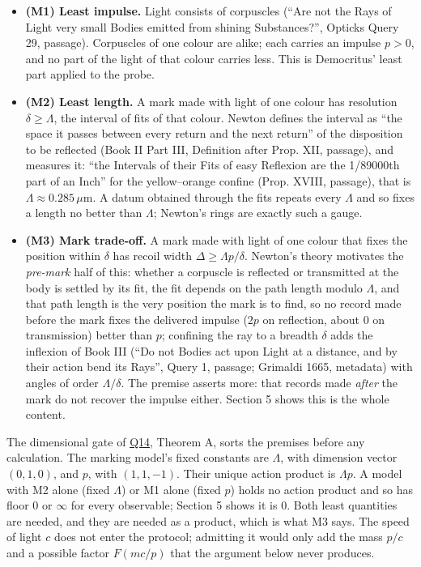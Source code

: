 \documentclass[11pt,a4paper]{article}
\newcommand{\tightlist}{\setlength{\itemsep}{0pt}\setlength{\parskip}{0pt}}
\begin{document}
\begin{itemize}
\tightlist
\item
  \textbf{(M1) Least impulse.} Light consists of corpuscles (``Are not
  the Rays of Light very small Bodies emitted from shining
  Substances?'', Opticks Query 29, passage). Corpuscles of one colour
  are alike; each carries an impulse \(p>0\), and no part of the light
  of that colour carries less. This is Democritus' least part applied to
  the probe.
\item
  \textbf{(M2) Least length.} A mark made with light of one colour has
  resolution \(\delta\ge\Lambda\), the interval of fits of that colour.
  Newton defines the interval as ``the space it passes between every
  return and the next return'' of the disposition to be reflected (Book
  II Part III, Definition after Prop. XII, passage), and measures it:
  ``the Intervals of their Fits of easy Reflexion are the 1/89000th part
  of an Inch'' for the yellow--orange confine (Prop. XVIII, passage),
  that is \(\Lambda\approx0.285\,\mu\)m. A datum obtained through the
  fits repeats every \(\Lambda\) and so fixes a length no better than
  \(\Lambda\); Newton's rings are exactly such a gauge.
\item
  \textbf{(M3) Mark trade-off.} A mark made with light of one colour
  that fixes the position within \(\delta\) has recoil width
  \(\Delta\ge\Lambda p/\delta\). Newton's theory motivates the
  \emph{pre-mark} half of this: whether a corpuscle is reflected or
  transmitted at the body is settled by its fit, the fit depends on the
  path length modulo \(\Lambda\), and that path length is the very
  position the mark is to find, so no record made before the mark fixes
  the delivered impulse (\(2p\) on reflection, about \(0\) on
  transmission) better than \(p\); confining the ray to a breadth
  \(\delta\) adds the inflexion of Book III (``Do not Bodies act upon
  Light at a distance, and by their action bend its Rays'', Query 1,
  passage; Grimaldi 1665, metadata) with angles of order
  \(\Lambda/\delta\). The premise asserts more: that records made
  \emph{after} the mark do not recover the impulse either. Section 5
  shows this is the whole content.
\end{itemize}

The dimensional gate of
\href{action-unit-dimensional-selection.md}{Q14}, Theorem A, sorts the
premises before any calculation. The marking model's fixed constants are
\(\Lambda\), with dimension vector \((0,1,0)\), and \(p\), with
\((1,1,-1)\). Their unique action product is \(\Lambda p\). A model with
M2 alone (fixed \(\Lambda\)) or M1 alone (fixed \(p\)) holds no action
product and so has floor \(0\) or \(\infty\) for every observable;
Section 5 shows it is \(0\). Both least quantities are needed, and they
are needed as a product, which is what M3 says. The speed of light \(c\)
does not enter the protocol; admitting it would only add the mass
\(p/c\) and a possible factor \(F(mc/p)\) that the argument below never
produces.
\end{document}
